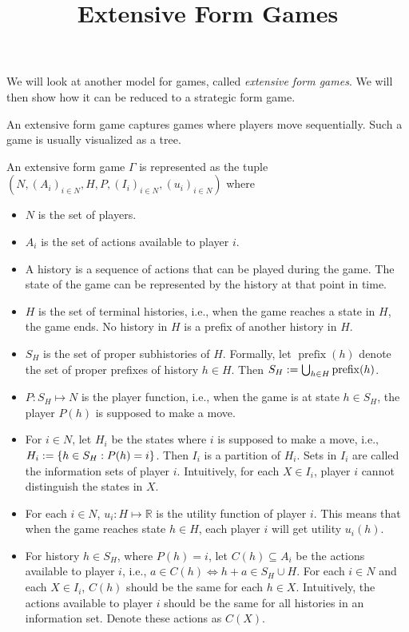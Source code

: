 
\usepackage{diagbox}
\usepackage{tikz}
\usetikzlibrary{arrows.meta}

\title{Extensive Form Games}



\maketitle
\initMinimal{}

We will look at another model for games, called \emph{extensive form games}.
We will then show how it can be reduced to a strategic form game.

An extensive form game captures games where players move sequentially.
Such a game is usually visualized as a tree.

An extensive form game $\Gamma$ is represented as the tuple
$(N, (A_i)_{i \in N}, H, P, (I_i)_{i \in N}, (u_i)_{i \in N})$ where
\begin{itemize}
\item $N$ is the set of players.
\item $A_i$ is the set of actions available to player $i$.
\item A history is a sequence of actions that can be played during the game.
    The state of the game can be represented by the history at that point in time.
\item $H$ is the set of terminal histories, i.e.,
    when the game reaches a state in $H$, the game ends.
    No history in $H$ is a prefix of another history in $H$.
\item $S_H$ is the set of proper subhistories of $H$. Formally, let
    $\operatorname{prefix}(h)$ denote the set of proper prefixes of history $h \in H$.
    Then $S_H := \bigcup_{h \in H} \operatorname{prefix}(h)$.
\item $P: S_H \mapsto N$ is the player function, i.e., when the game is at state $h \in S_H$,
    the player $P(h)$ is supposed to make a move.
\item For $i \in N$, let $H_i$ be the states where $i$ is supposed to make a move,
    i.e., $H_i := \{h \in S_H: P(h) = i\}$. Then $I_i$ is a partition of $H_i$.
    Sets in $I_i$ are called the information sets of player $i$.
    Intuitively, for each $X \in I_i$, player $i$ cannot distinguish the states in $X$.
\item For each $i \in N$, $u_i: H \mapsto \mathbb{R}$ is the utility function of player $i$.
    This means that when the game reaches state $h \in H$,
    each player $i$ will get utility $u_i(h)$.
\item For history $h \in S_H$, where $P(h) = i$, let $C(h) \subseteq A_i$ be the
    actions available to player $i$, i.e., $a \in C(h) \iff h + a \in S_H \cup H$.
    For each $i \in N$ and each $X \in I_i$, $C(h)$ should be the same for each $h \in X$.
    Intuitively, the actions available to player $i$ should be the same
    for all histories in an information set. Denote these actions as $C(X)$.
\end{itemize}

